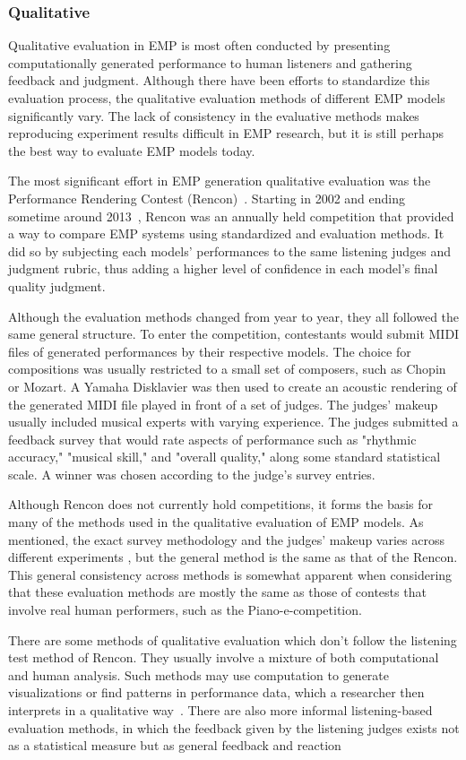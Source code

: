 \subsubsection{Qualitative}
Qualitative evaluation in EMP is most often conducted by presenting computationally generated performance to human listeners and gathering feedback and judgment. Although there have been efforts to standardize this evaluation process, the qualitative evaluation methods of different EMP models significantly vary. The lack of consistency in the evaluative methods makes reproducing experiment results difficult in EMP research, but it is still perhaps the best way to evaluate EMP models today. 

The most significant effort in EMP generation qualitative evaluation was the Performance Rendering Contest (Rencon)~\cite{katayose2012evaluating}. Starting in 2002 and ending sometime around 2013~\cite{cancino2018computational}, Rencon was an annually held competition that provided a way to compare EMP systems using standardized and evaluation methods. It did so by subjecting each models' performances to the same listening judges and judgment rubric, thus adding a higher level of confidence in each model's final quality judgment. 

Although the evaluation methods changed from year to year, they all followed the same general structure. To enter the competition, contestants would submit MIDI files of generated performances by their respective models. The choice for compositions was usually restricted to a small set of composers, such as Chopin or Mozart. A Yamaha Disklavier was then used to create an acoustic rendering of the generated MIDI file played in front of a set of judges. The judges' makeup usually included musical experts with varying experience. The judges submitted a feedback survey that would rate aspects of performance such as "rhythmic accuracy," "musical skill," and "overall quality," along some standard statistical scale. A winner was chosen according to the judge's survey entries. 

Although Rencon does not currently hold competitions, it forms the basis for many of the methods used in the qualitative evaluation of EMP models. As mentioned, the exact survey methodology and the judges' makeup varies across different experiments \cite{jeong2019virtuosonet, schubert2017algorithms}, but the general method is the same as that of the Rencon. This general consistency across methods is somewhat apparent when considering that these evaluation methods are mostly the same as those of contests that involve real human performers, such as the Piano-e-competition. 

There are some methods of qualitative evaluation which don't follow the listening test method of Rencon. They usually involve a mixture of both computational and human analysis. Such methods may use computation to generate visualizations or find patterns in performance data, which a researcher then interprets in a qualitative way~\cite{widmer2009yqx,jeong2019score, grachten2012linear}. There are also more informal listening-based evaluation methods, in which the feedback given by the listening judges exists not as a statistical measure but as general feedback and reaction~\cite{oore2020time}